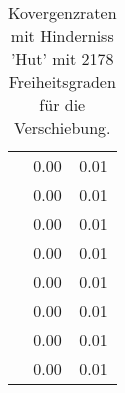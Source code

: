 \begin{table}
\begin{tabular}{c|cc|}
\multicolumn{1}{|c|}{} & \multicolumn{1}{|c|}{      0.00} & \multicolumn{1}{|c|}{      0.01} \\ 
\multicolumn{1}{|c|}{} & \multicolumn{1}{|c|}{      0.00} & \multicolumn{1}{|c|}{      0.01} \\ 
\multicolumn{1}{|c|}{} & \multicolumn{1}{|c|}{      0.00} & \multicolumn{1}{|c|}{      0.01} \\ 
\multicolumn{1}{|c|}{} & \multicolumn{1}{|c|}{      0.00} & \multicolumn{1}{|c|}{      0.01} \\ 
\multicolumn{1}{|c|}{} & \multicolumn{1}{|c|}{      0.00} & \multicolumn{1}{|c|}{      0.01} \\ 
\multicolumn{1}{|c|}{} & \multicolumn{1}{|c|}{      0.00} & \multicolumn{1}{|c|}{      0.01} \\ 
\multicolumn{1}{|c|}{} & \multicolumn{1}{|c|}{      0.00} & \multicolumn{1}{|c|}{      0.01} \\ 
\multicolumn{1}{|c|}{} & \multicolumn{1}{|c|}{      0.00} & \multicolumn{1}{|c|}{      0.01} \\ 
\hline 
\end{tabular}\caption{Kovergenzraten mit Hinderniss 'Hut' mit 2178 Freiheitsgraden für die Verschiebung.}\label{tab:Rate_Hut_level4}
\end{table} 
